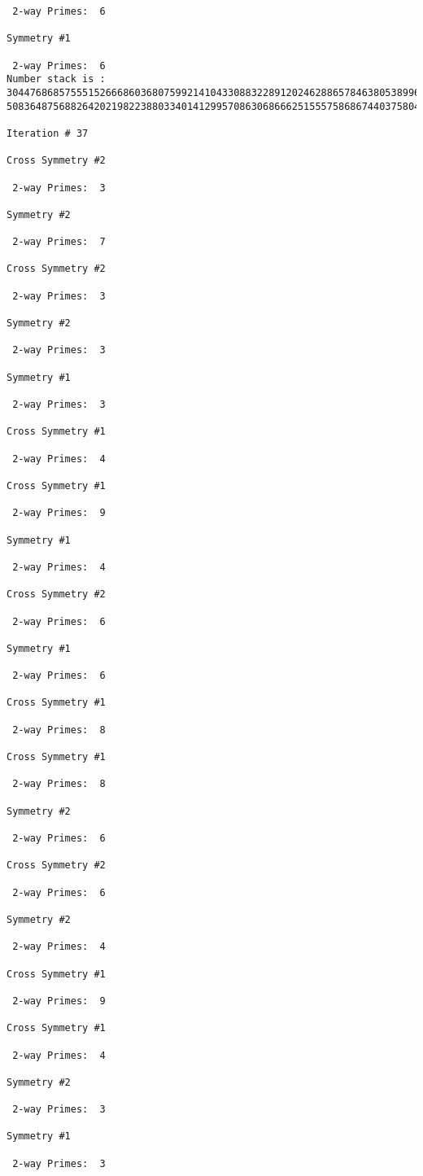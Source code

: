 {{{{\begin{verbatim}
 2-way Primes: 	6

Symmetry #1

 2-way Primes: 	6
Number stack is :
30447686857555152666860368075992141043308832289120246288657846380538996794608835958544046240163340857
50836487568826420219822388033401412995708630686662515557586867440375804336104264044585953880649769983

Iteration #	37

Cross Symmetry #2

 2-way Primes: 	3

Symmetry #2

 2-way Primes: 	7

Cross Symmetry #2

 2-way Primes: 	3

Symmetry #2

 2-way Primes: 	3

Symmetry #1

 2-way Primes: 	3

Cross Symmetry #1

 2-way Primes: 	4

Cross Symmetry #1

 2-way Primes: 	9

Symmetry #1

 2-way Primes: 	4

Cross Symmetry #2

 2-way Primes: 	6

Symmetry #1

 2-way Primes: 	6

Cross Symmetry #1

 2-way Primes: 	8

Cross Symmetry #1

 2-way Primes: 	8

Symmetry #2

 2-way Primes: 	6

Cross Symmetry #2

 2-way Primes: 	6

Symmetry #2

 2-way Primes: 	4

Cross Symmetry #1

 2-way Primes: 	9

Cross Symmetry #1

 2-way Primes: 	4

Symmetry #2

 2-way Primes: 	3

Symmetry #1

 2-way Primes: 	3


\end{verbatim}}}}}
